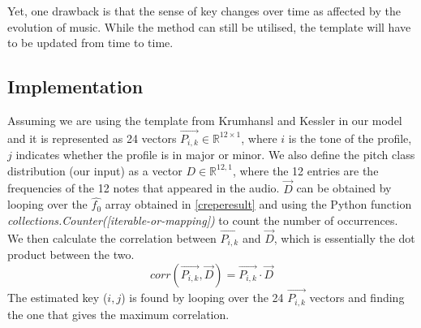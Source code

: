 Yet, one drawback is that the sense of key changes over time as affected by the evolution of music. While the method can still be utilised, the template will have to be
updated from time to time.

\subsection{Implementation}
Assuming we are using the template from Krumhansl and Kessler in our model and it is represented as 24 vectors $\vec{P_{i,k}} \in \mathbb{R}^{12 \times 1}$, 
where $i$ is the tone of the profile, $j$ indicates whether the profile is in major or minor.
We also define the pitch class distribution (our input) as a vector $D \in \mathbb{R}^{12,1}$, where the 12 entries are the frequencies of the 12 notes that appeared in the audio.
$\vec{D}$ can be obtained by looping over the $\hat{f_0}$ array obtained in \autoref{creperesult} and using the Python function \emph{collections.Counter([iterable-or-mapping])} to count the
number of occurrences. We then calculate the correlation between $\vec{P_{i,k}}$ and $\vec{D}$, which is essentially the dot product between the two.
\[ corr(\vec{P_{i,k}},\vec{D}) = \vec{P_{i,k}} \cdot \vec{D} \]
The estimated key ($i,j$) is found by looping over the 24 $\vec{P_{i,k}}$ vectors and finding the one that gives the maximum correlation.

